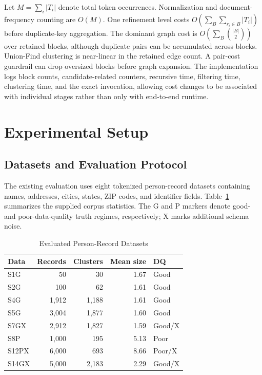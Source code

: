 \documentclass[conference]{IEEEtran}
\begin{document}
Let $M=\sum_i |T_i|$ denote total token occurrences. Normalization and document-frequency counting are $O(M)$. One refinement level costs $O(\sum_B\sum_{r_i\in B}|T_i|)$ before duplicate-key aggregation. The dominant graph cost is $O(\sum_B { |B| \choose 2})$ over retained blocks, although duplicate pairs can be accumulated across blocks. Union-Find clustering is near-linear in the retained edge count. A pair-cost guardrail can drop oversized blocks before graph expansion. The implementation logs block counts, candidate-related counters, recursive time, filtering time, clustering time, and the exact invocation, allowing cost changes to be associated with individual stages rather than only with end-to-end runtime.

\section{Experimental Setup}
\subsection{Datasets and Evaluation Protocol}
The existing evaluation uses eight tokenized person-record datasets containing names, addresses, cities, states, ZIP codes, and identifier fields. Table~\ref{tab:data} summarizes the supplied corpus statistics. The G and P markers denote good- and poor-data-quality truth regimes, respectively; X marks additional schema noise.

\begin{table}[t]
\caption{Evaluated Person-Record Datasets}
\label{tab:data}
\centering
\scriptsize
\begin{tabular}{lrrrl}
\toprule
Data & Records & Clusters & Mean size & DQ \\
\midrule
S1G   & 50    & 30   & 1.67 & Good \\
S2G   & 100   & 62   & 1.61 & Good \\
S4G   & 1,912 & 1,188& 1.61 & Good \\
S5G   & 3,004 & 1,877& 1.60 & Good \\
S7GX  & 2,912 & 1,827& 1.59 & Good/X \\
S8P   & 1,000 & 195  & 5.13 & Poor \\
S12PX & 6,000 & 693  & 8.66 & Poor/X \\
S14GX & 5,000 & 2,183& 2.29 & Good/X \\
\bottomrule
\end{tabular}
\end{table}
\end{document}

